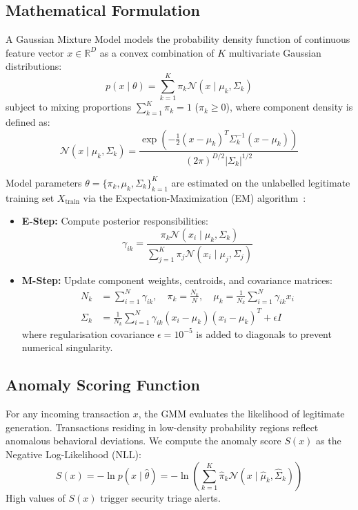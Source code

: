 \documentclass[10pt,journal,compsoc]{IEEEtran}
\begin{document}
\subsection{Mathematical Formulation}
A Gaussian Mixture Model models the probability density function of continuous feature vector $x \in \mathbb{R}^D$ as a convex combination of $K$ multivariate Gaussian distributions:
\begin{equation}
p(x \mid \theta) = \sum_{k=1}^{K} \pi_k \mathcal{N}(x \mid \mu_k, \Sigma_k)
\end{equation}
subject to mixing proportions $\sum_{k=1}^K \pi_k = 1$ ($\pi_k \ge 0$), where component density is defined as:
\begin{equation}
\mathcal{N}(x \mid \mu_k, \Sigma_k) = \frac{\exp\left(-\frac{1}{2}(x - \mu_k)^T \Sigma_k^{-1} (x - \mu_k)\right)}{(2\pi)^{D/2} |\Sigma_k|^{1/2}}
\end{equation}

Model parameters $\theta = \{\pi_k, \mu_k, \Sigma_k\}_{k=1}^K$ are estimated on the unlabelled legitimate training set $X_{\text{train}}$ via the Expectation-Maximization (EM) algorithm~\cite{bishop2006pattern}:
\begin{itemize}
    \item \textbf{E-Step:} Compute posterior responsibilities:
    \begin{equation}
    \gamma_{ik} = \frac{\pi_k \mathcal{N}(x_i \mid \mu_k, \Sigma_k)}{\sum_{j=1}^K \pi_j \mathcal{N}(x_i \mid \mu_j, \Sigma_j)}
    \end{equation}
    \item \textbf{M-Step:} Update component weights, centroids, and covariance matrices:
    \begin{align}
    N_k &= \sum_{i=1}^N \gamma_{ik}, \quad \pi_k = \frac{N_k}{N}, \quad \mu_k = \frac{1}{N_k} \sum_{i=1}^N \gamma_{ik} x_i \\
    \Sigma_k &= \frac{1}{N_k} \sum_{i=1}^N \gamma_{ik} (x_i - \mu_k)(x_i - \mu_k)^T + \epsilon I
    \end{align}
    where regularisation covariance $\epsilon = 10^{-5}$ is added to diagonals to prevent numerical singularity.
\end{itemize}

\subsection{Anomaly Scoring Function}
For any incoming transaction $x$, the GMM evaluates the likelihood of legitimate generation. Transactions residing in low-density probability regions reflect anomalous behavioral deviations. We compute the anomaly score $S(x)$ as the Negative Log-Likelihood (NLL):
\begin{equation}
S(x) = -\ln p(x \mid \hat{\theta}) = -\ln \left( \sum_{k=1}^K \hat{\pi}_k \mathcal{N}(x \mid \hat{\mu}_k, \hat{\Sigma}_k) \right)
\end{equation}
High values of $S(x)$ trigger security triage alerts.
\end{document}
